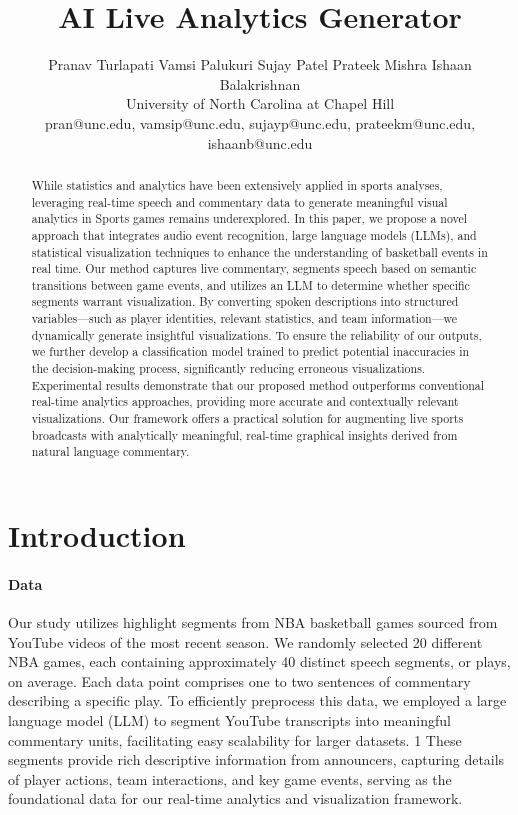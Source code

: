 \documentclass{article}
\title{AI Live Analytics Generator}
\author{
  Pranav Turlapati \quad
  Vamsi Palukuri \quad
  Sujay Patel \quad
  Prateek Mishra \quad
  Ishaan Balakrishnan \\
  University of North Carolina at Chapel Hill \\
  pran@unc.edu, vamsip@unc.edu, sujayp@unc.edu, prateekm@unc.edu, ishaanb@unc.edu
}
\begin{document}
\maketitle


\begin{abstract}
  While statistics and analytics have been extensively applied in sports analyses, leveraging real-time speech and commentary data to generate meaningful visual analytics in Sports games remains underexplored. In this paper, we propose a novel approach that integrates audio event recognition, large language models (LLMs), and statistical visualization techniques to enhance the understanding of basketball events in real time. Our method captures live commentary, segments speech based on semantic transitions between game events, and utilizes an LLM to determine whether specific segments warrant visualization. By converting spoken descriptions into structured variables—such as player identities, relevant statistics, and team information—we dynamically generate insightful visualizations. To ensure the reliability of our outputs, we further develop a classification model trained to predict potential inaccuracies in the decision-making process, significantly reducing erroneous visualizations. Experimental results demonstrate that our proposed method outperforms conventional real-time analytics approaches, providing more accurate and contextually relevant visualizations. Our framework offers a practical solution for augmenting live sports broadcasts with analytically meaningful, real-time graphical insights derived from natural language commentary.

\end{abstract}


\section{Introduction}

\paragraph{Data}

Our study utilizes highlight segments from NBA basketball games sourced from YouTube
videos of the most recent season. We randomly selected 20 different NBA games, each
containing approximately 40 distinct speech segments, or plays, on average. Each data
point comprises one to two sentences of commentary describing a specific play. To efficiently
preprocess this data, we employed a large language model (LLM) to segment YouTube
transcripts into meaningful commentary units, facilitating easy scalability for larger datasets.
1
These segments provide rich descriptive information from announcers, capturing details of
player actions, team interactions, and key game events, serving as the foundational data for
our real-time analytics and visualization framework.
\end{document}
